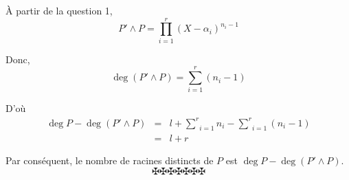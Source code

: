 
{\`A} partir de la question 1,
\[ P' \wedge P = \underset{i = 1}{\overset{r}{\prod}} (X - \alpha_i)^{n_i - 1}
\]


Donc,
\[ \deg (P' \wedge P) = \underset{i = 1}{\overset{r}{\sum}} (n_i - 1) \]


D'o{\`u}
\begin{eqnarray*}
  \deg P - \deg (P' \wedge P) & = & l + \underset{i = 1}{\overset{r}{\sum}}
  n_i - \underset{i = 1}{\overset{r}{\sum}} (n_i - 1)\\
  & = & l + r
\end{eqnarray*}


Par cons{\'e}quent, le nombre de racines distincts de $P$ est $\deg P - \deg
(P' \wedge P)$.
\[ \maltese \maltese \maltese \maltese \maltese \maltese \maltese \]